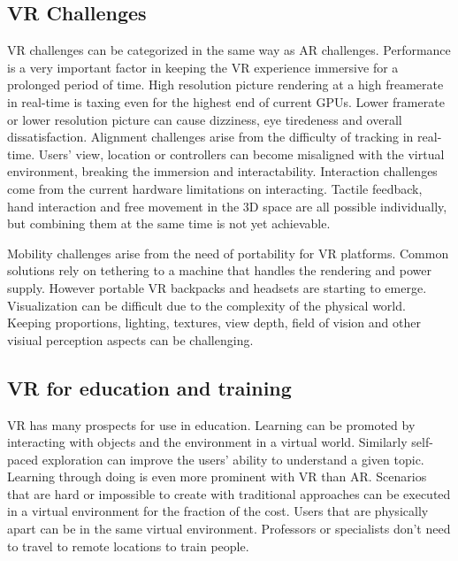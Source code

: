 \documentclass[12pt, a4paper,oneside, nocenter]{thesis}
\begin{document}
\subsection{VR Challenges}
VR challenges can be categorized in the same way as AR challenges.
Performance is a very important factor in keeping the VR experience immersive for a prolonged period of time.
High resolution picture rendering at a high freamerate in real-time is taxing even for the highest end of current GPUs. 
Lower framerate or lower resolution picture can cause dizziness, eye tiredeness and overall dissatisfaction. Alignment challenges arise from the difficulty of tracking in real-time.
Users' view, location or controllers can become misaligned with the virtual environment, breaking the immersion and interactability.
Interaction challenges come from the current hardware limitations on interacting. Tactile feedback, hand interaction and free movement in the 3D space are all possible individually, but combining them at the same time is not yet achievable.
\par %
Mobility challenges arise from the need of portability for VR platforms. Common solutions
rely on tethering to a machine that handles the rendering and power supply. However portable VR backpacks and headsets are starting to emerge\citep{hp-vrbackpack}.
Visualization can be difficult due to the complexity of the physical world. Keeping proportions, lighting, textures, view depth, field of vision and other visiual perception aspects can be challenging.
\subsection{VR for education and training}
VR has many prospects for use in education. Learning can be promoted by interacting with objects and the environment in a virtual world. 
Similarly self-paced exploration can improve the users' ability to understand a given topic.
Learning through doing is even more prominent with VR than AR. Scenarios that are hard or impossible to create with traditional approaches can be executed in a virtual environment for the fraction of the cost.
Users that are physically apart can be in the same virtual environment.
Professors or specialists don't need to travel to remote locations to train people.
\end{document}
